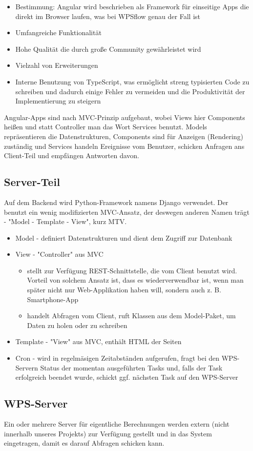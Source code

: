         \begin{itemize}
            \item Bestimmung: Angular wird beschrieben als Framework für einseitige Apps die direkt im Browser laufen, was bei WPSflow genau der Fall ist
            \item Umfangreiche Funktionalität
            \item Hohe Qualität die durch große Community gewährleistet wird
            \item Vielzahl von Erweiterungen
            \item Interne Benutzung von TypeScript, was ermöglicht streng typisierten Code zu schreiben und dadurch einige Fehler zu vermeiden und die Produktivität der Implementierung zu steigern
        \end{itemize}

        Angular-Apps sind nach MVC-Prinzip aufgebaut, wobei Views hier Components heißen und statt Controller man das Wort Services benutzt. Models repräsentieren die Datenstrukturen, Components sind für Anzeigen (Rendering) zuständig und Services handeln Ereignisse vom Benutzer, schicken Anfragen ans Client-Teil und empfängen Antworten davon.
        
        \subsection{Server-Teil}
        
        Auf dem Backend wird Python-Framework namens Django verwendet. Der benutzt ein wenig modifizierten MVC-Ansatz, der deswegen anderen Namen trägt - "Model - Template - View", kurz MTV.
        
        \begin{itemize}
            \item Model - definiert Datenstrukturen und dient dem Zugriff zur Datenbank
            \item View - "Controller" aus MVC 
            
            \begin{itemize}
                \item stellt zur Verfügung REST-Schnittstelle, die vom Client benutzt wird. Vorteil von solchem Ansatz ist, dass es wiederverwendbar ist, wenn man später nicht nur Web-Applikation haben will, sondern auch z. B. Smartphone-App
                \item handelt Abfragen vom Client, ruft Klassen aus dem Model-Paket, um Daten zu holen oder zu schreiben
            \end{itemize}
            \item Template - "View" aus MVC, enthält HTML der Seiten 
            \item Cron - wird in regelmäsigen Zeitabständen aufgerufen, fragt bei den WPS-Servern Status der momentan ausgeführten Tasks und, falls der Task erfolgreich beendet wurde, schickt ggf. nächsten Task auf den WPS-Server
        \end{itemize}
        
        \subsection{WPS-Server}
        
        Ein oder mehrere Server für eigentliche Berechnungen werden extern (nicht innerhalb unseres Projekts) zur Verfügung gestellt und in das System eingetragen, damit es darauf Abfragen schicken kann.
    